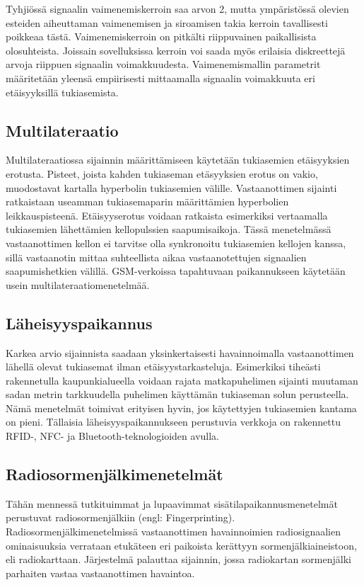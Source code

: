 Tyhjiössä signaalin vaimenemiskerroin saa arvon 2, mutta ympäristössä
olevien esteiden aiheuttaman vaimenemisen ja siroamisen takia
kerroin tavallisesti poikkeaa tästä. Vaimenemiskerroin on pitkälti riippuvainen
paikallisista
olosuhteista. Joissain sovelluksissa kerroin voi saada myös erilaisia 
diskreettejä arvoja riippuen signaalin voimakkuudesta. Vaimenemismallin
parametrit määritetään yleensä empiirisesti mittaamalla signaalin
voimakkuuta eri etäisyyksillä tukiasemista.

\subsection{Multilateraatio}

Multilateraatiossa sijainnin määrittämiseen käytetään tukiasemien
etäisyyksien erotusta. Pisteet, joista kahden tukiaseman etäsyyksien erotus
on vakio, muodostavat
kartalla hyperbolin tukiasemien välille. Vastaanottimen sijainti ratkaistaan 
useamman tukiasemaparin määrittämien hyperbolien leikkauspisteenä.
Etäisyyserotus voidaan ratkaista esimerkiksi vertaamalla tukiasemien
lähettämien kellopulssien saapumisaikoja. Tässä menetelmässä vastaanottimen
kellon ei tarvitse olla synkronoitu tukiasemien kellojen kanssa, sillä
vastaanotin mittaa suhteellista aikaa vastaanotettujen signaalien
saapumishetkien välillä. GSM-verkoissa tapahtuvaan paikannukseen käytetään
usein multilateraatiomenetelmää.

\subsection{Läheisyyspaikannus}

Karkea arvio sijainnista saadaan yksinkertaisesti havainnoimalla
vastaanottimen lähellä olevat tukiasemat ilman etäisyystarkasteluja.
Esimerkiksi tiheästi rakennetulla kaupunkialueella voidaan rajata matkapuhelimen
sijainti muutaman sadan metrin tarkkuudella puhelimen käyttämän tukiaseman solun
perusteella. Nämä menetelmät toimivat erityisen hyvin, jos käytettyjen
tukiasemien kantama on pieni. Tällaisia läheisyyspaikannukseen perustuvia
verkkoja on rakennettu RFID-, NFC- ja Bluetooth-teknologioiden avulla.

\subsection{Radiosormenjälkimenetelmät}

Tähän mennessä tutkituimmat ja lupaavimmat sisätilapaikannusmenetelmät
perustuvat radiosormenjälkiin (engl: Fingerprinting).
Radiosormenjälkimenetelmissä vastaanottimen
havainnoimien radiosignaalien ominaisuuksia verrataan etukäteen eri 
paikoista kerättyyn sormenjälkiaineistoon, eli radiokarttaan.
Järjestelmä palauttaa sijainnin, jossa
radiokartan sormenjälki parhaiten vastaa vastaanottimen havaintoa.

